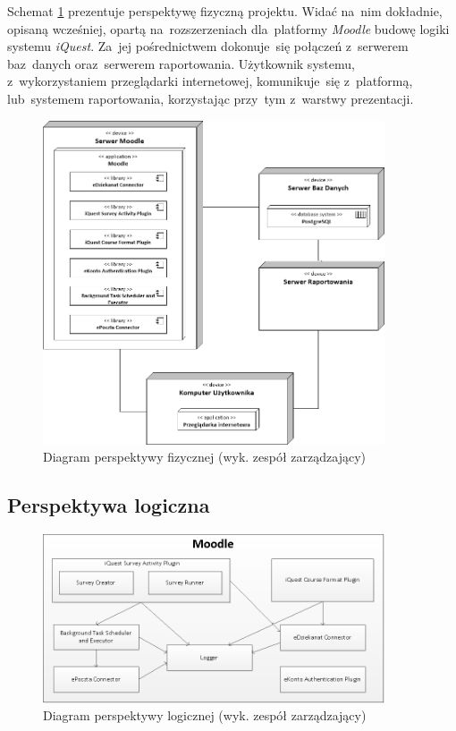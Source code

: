 Schemat \ref{rys:PerspektywaFizyczna} prezentuje perspektywę fizyczną projektu. Widać na~nim dokładnie, opisaną wcześniej, opartą na~rozszerzeniach dla~platformy \textit{Moodle} budowę logiki systemu \textit{iQuest}. Za~jej pośrednictwem dokonuje~się połączeń z~serwerem baz~danych oraz~serwerem raportowania. Użytkownik systemu, z~wykorzystaniem przeglądarki internetowej, komunikuje~się z~platformą, lub~systemem raportowania, korzystając przy~tym z~warstwy prezentacji.

\begin{figure}[H]
\centering\includegraphics[width=0.9\textwidth]{figures/PhysicalView}
\caption{Diagram perspektywy fizycznej (wyk. zespół zarządzający)}\label{rys:PerspektywaFizyczna}
\end{figure}

\subsection{Perspektywa logiczna}
\label{Chapter542}

\begin{figure}[H]
\centering\includegraphics[width=0.9\textwidth]{figures/LogicalView}
\caption{Diagram perspektywy logicznej (wyk. zespół zarządzający)}\label{rys:PerspektywaLogiczna}
\end{figure}

